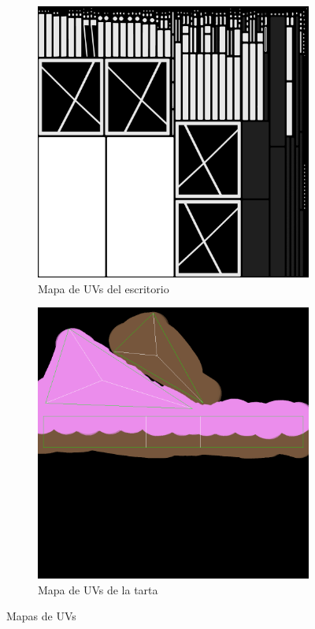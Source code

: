 \documentclass[12pt, a4paper,twoside,titlepage]{book}
\begin{document}
\begin{figure}
	\centering
	\begin{subfigure}{.5\textwidth}
		\centering
		\includegraphics[width=.95\linewidth]{TGF/Artes/pc_desk_albedo2.png}
		\caption{Mapa de UVs del escritorio}
	\end{subfigure}%
	\begin{subfigure}{.5\textwidth}
		\centering
		\includegraphics[width=.95\linewidth]{TGF/Artes/Caketext.png}
		\caption{Mapa de UVs de la tarta}
	\end{subfigure}
	\caption{Mapas de UVs}
	\label{fig:texUvs}
\end{figure}
\end{document}

